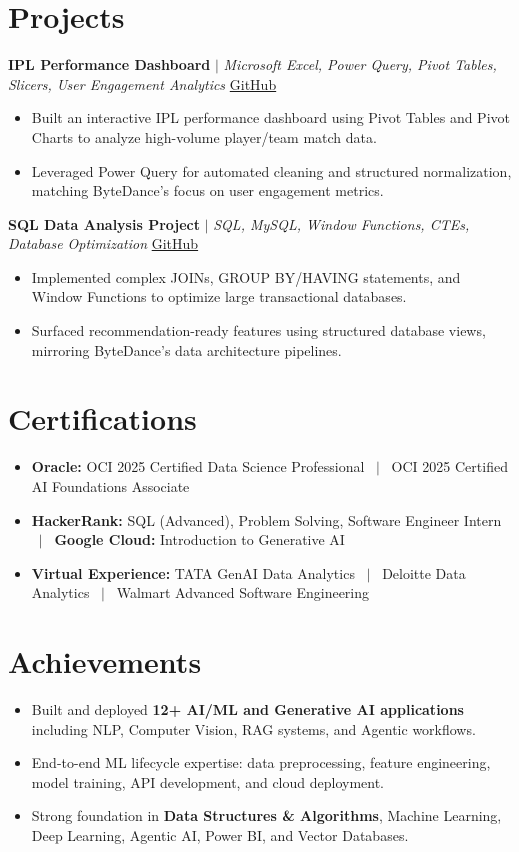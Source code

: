 \documentclass[a4paper,9pt]{article}
\newcommand{\resumeItem}[1]{\item\small #1}
\begin{document}
\vspace{-2mm}

\section{Projects}

\noindent\textbf{IPL Performance Dashboard} $|$ \textit{Microsoft Excel, Power Query, Pivot Tables, Slicers, User Engagement Analytics} \hfill
\href{https://github.com/hsachan295-source/Power-BI-Portfolio}{\small GitHub}
\begin{itemize}
\resumeItem{Built an interactive IPL performance dashboard using Pivot Tables and Pivot Charts to analyze high-volume player/team match data.}
\resumeItem{Leveraged Power Query for automated cleaning and structured normalization, matching ByteDance's focus on user engagement metrics.}
\end{itemize}

\vspace{1.5pt}
\noindent\textbf{SQL Data Analysis Project} $|$ \textit{SQL, MySQL, Window Functions, CTEs, Database Optimization} \hfill
\href{https://github.com/hsachan295-source/smart-business-dashboard}{\small GitHub}
\begin{itemize}
\resumeItem{Implemented complex JOINs, GROUP BY/HAVING statements, and Window Functions to optimize large transactional databases.}
\resumeItem{Surfaced recommendation-ready features using structured database views, mirroring ByteDance's data architecture pipelines.}
\end{itemize}


\vspace{-2mm}

\section{Certifications}
\begin{itemize}
\resumeItem{\textbf{Oracle:} OCI 2025 Certified Data Science Professional ~$|$~ OCI 2025 Certified AI Foundations Associate}
\resumeItem{\textbf{HackerRank:} SQL (Advanced), Problem Solving, Software Engineer Intern ~$|$~ \textbf{Google Cloud:} Introduction to Generative AI}
\resumeItem{\textbf{Virtual Experience:} TATA GenAI Data Analytics ~$|$~ Deloitte Data Analytics ~$|$~ Walmart Advanced Software Engineering}
\end{itemize}

\vspace{-2mm}

\section{Achievements}
\begin{itemize}
\resumeItem{Built and deployed \textbf{12+ AI/ML and Generative AI applications} including NLP, Computer Vision, RAG systems, and Agentic workflows.}
\resumeItem{End-to-end ML lifecycle expertise: data preprocessing, feature engineering, model training, API development, and cloud deployment.}
\resumeItem{Strong foundation in \textbf{Data Structures \& Algorithms}, Machine Learning, Deep Learning, Agentic AI, Power BI, and Vector Databases.}
\end{itemize}
\end{document}
